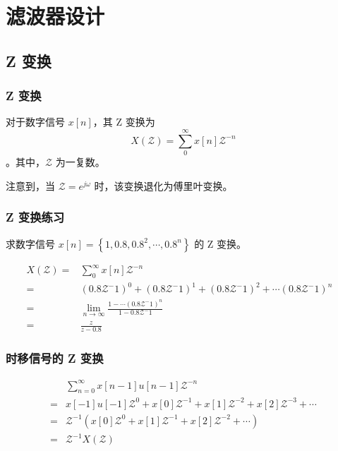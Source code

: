 \documentclass{ctexbeamer}
\begin{document}
	\section{滤波器设计}

	\subsection{Z 变换}

	\begin{frame}
		\frametitle{Z 变换}
		\begin{definition}[Z 变换]
			对于数字信号 $x[n]$，其 Z 变换为 $$X(\mathcal{Z})=\sum_0^{\infty}x[n]\mathcal{Z}^{-n}$$。其中，$\mathcal{Z}$ 为一复数。
		\end{definition}

		注意到，当 $\mathcal{Z}=e^{j\omega}$ 时，该变换退化为傅里叶变换。
	\end{frame}
	\begin{frame}[allowframebreaks]
		\frametitle{Z 变换练习}
		\begin{problem}
			求数字信号 $x[n]=\left\{1,0.8,0.8^2,\cdots,0.8^n\right\}$ 的 Z 变换。
		\end{problem}
		\begin{solution}
			\begin{equation*}\begin{aligned}
X(\mathcal{Z}) =& \sum_0^{\infty}x[n]\mathcal{Z}^{-n} & \\
= & \left(0.8\mathcal{Z}^-1\right)^0+\left(0.8\mathcal{Z}^-1\right)^1+\left(0.8\mathcal{Z}^-1\right)^2+\cdots\left(0.8\mathcal{Z}^-1\right)^n \\
=& \lim_{n\rightarrow\infty}\frac{1-\cdots\left(0.8\mathcal{Z}^-1\right)^n}{1-0.8\mathcal{Z}^-1} \\
=& \frac{z}{z-0.8}
\end{aligned}\end{equation*}
		\end{solution}

	\end{frame}
	\begin{frame}
			\frametitle{时移信号的 Z 变换}
			\begin{equation*}
				\begin{aligned}
{} & \sum_{n=0}^{\infty}x[n-1]u[n-1]\mathcal{Z}^{-n}  \\
=& x[-1]u[-1]\mathcal{Z}^0+x[0]\mathcal{Z}^{-1}+x[1]\mathcal{Z}^{-2}+x[2]\mathcal{Z}^{-3}+\cdots \\
=& \mathcal{Z}^{-1}(x[0]\mathcal{Z}^0+x[1]\mathcal{Z}^{-1}+x[2]\mathcal{Z}^{-2}+\cdots) \\
=& \mathcal{Z}^{-1}X(\mathcal{Z})
\end{aligned}
			\end{equation*}
			

	\end{frame}
\end{document}
